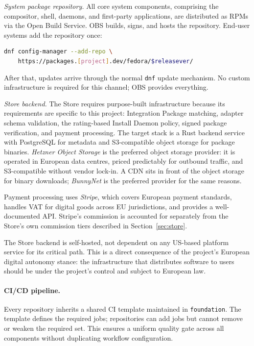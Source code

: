 \emph{System package repository.} All core system components, comprising the compositor,
shell, daemons, and first-party applications, are distributed as RPMs via the
Open Build Service. OBS builds, signs, and hosts the repository. End-user
systems add the repository once:

\begin{lstlisting}[language=bash]
dnf config-manager --add-repo \
    https://packages.[project].dev/fedora/$releasever/
\end{lstlisting}

After that, updates arrive through the normal \texttt{dnf} update mechanism.
No custom infrastructure is required for this channel; OBS provides everything.

\emph{Store backend.} The Store requires purpose-built infrastructure because
its requirements are specific to this project: Integration Package matching,
adapter schema validation, the rating-based Install Daemon policy, signed
package verification, and payment processing. The target stack is a Rust
backend service with PostgreSQL for metadata and S3-compatible object storage
for package binaries. \emph{Hetzner Object Storage} is the preferred object
storage provider: it is operated in European data centres, priced predictably
for outbound traffic, and S3-compatible without vendor lock-in. A CDN sits in
front of the object storage for binary downloads; \emph{BunnyNet} is the
preferred provider for the same reasons.

Payment processing uses \emph{Stripe}, which covers European payment standards,
handles VAT for digital goods across EU jurisdictions, and provides a
well-documented API. Stripe's commission is accounted for separately from the
Store's own commission tiers described in Section~\ref{sec:store}.

The Store backend is self-hosted, not dependent on any US-based platform
service for its critical path. This is a direct consequence of the project's
European digital autonomy stance: the infrastructure that distributes software
to users should be under the project's control and subject to European law.

\paragraph{CI/CD pipeline.}
Every repository inherits a shared CI template maintained in
\texttt{foundation}. The template defines the required jobs; repositories can
add jobs but cannot remove or weaken the required set. This ensures a uniform
quality gate across all components without duplicating workflow configuration.

